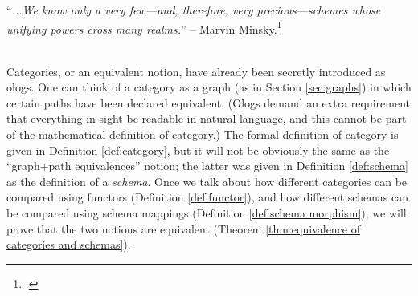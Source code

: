 \documentclass[CT4S-EN-RU]{subfiles}
\begin{document}
\chapter{}\label{chap:categories}

\begin{blockENG}
“{\it ...We know only a very few—and, therefore, very precious—schemes whose unifying powers cross many realms.}” -- Marvin Minsky.\footnote{\cite[Problems of disunity, p. 126]{Min}.}\\\\
\end{blockENG}

\begin{blockRUS}
\end{blockRUS}

\begin{blockENG}
Categories, or an equivalent notion, have already been secretly introduced as ologs. One can think of a category as a graph (as in Section \ref{sec:graphs}) in which certain paths have been declared equivalent. (Ologs demand an extra requirement that everything in sight be readable in natural language, and this cannot be part of the mathematical definition of category.) The formal definition of category is given in Definition \ref{def:category}, but it will not be obviously the same as the “graph+path equivalences” notion; the latter was given in Definition \ref{def:schema} as the definition of a {\em schema}. Once we talk about how different categories can be compared using functors (Definition \ref{def:functor}), and how different schemas can be compared using schema mappings (Definition \ref{def:schema morphism}), we will prove that the two notions are equivalent (Theorem \ref{thm:equivalence of categories and schemas}).
\end{blockENG}
\end{document}
